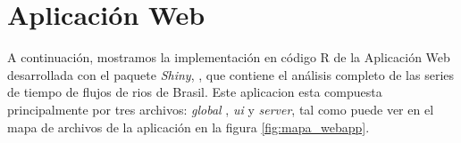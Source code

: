 \documentclass[12pt,oneside]{book}\usepackage[]{graphicx}\usepackage[]{color}
\theoremstyle{definition} %
\begin{document}



















\appendix


\chapter{Aplicación Web}
\label{apnd:webapp}

A continuación, mostramos la implementación en código R de la Aplicación Web desarrollada con el paquete \textit{Shiny}, \cite{shiny}, que contiene el análisis completo de las series de tiempo de flujos de rios de Brasil. Este aplicacion esta compuesta principalmente por tres archivos: \textit{global} , \textit{ui}  y \textit{server}, tal como puede ver en el mapa de archivos de la aplicación en la figura \ref{fig:mapa_webapp}.
\end{document}
